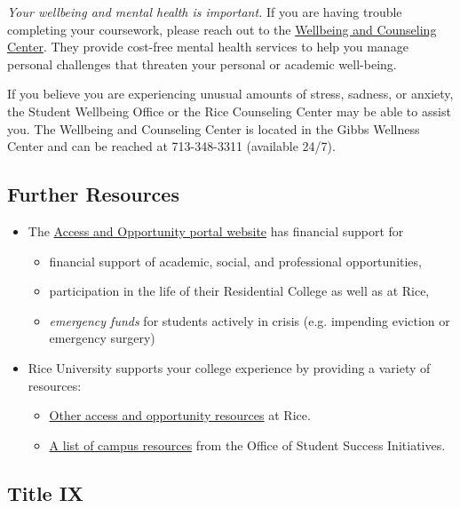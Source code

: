 \documentclass[11pt]{article}
\begin{document}
\emph{Your wellbeing and mental health is important.} If you are having trouble completing your coursework, please reach out to the \href{https://wellbeing.rice.edu/}{Wellbeing and Counseling Center}. They provide cost-free mental health services to help you manage personal challenges that threaten your personal or academic well-being. 

If you believe you are experiencing unusual amounts of stress, sadness, or anxiety, the Student Wellbeing Office or the Rice Counseling Center may be able to assist you. The Wellbeing and Counseling Center is located in the Gibbs Wellness Center and can be reached at 713-348-3311 (available 24/7).


\subsection{Further Resources}

\begin{itemize}[]
    \item The \href{https://aop.rice.edu/}{Access and Opportunity portal website} has financial support for
    \begin{itemize}[]
        \item financial support of academic, social, and professional opportunities,
        \item participation in the life of their Residential College as well as at Rice,
        \item \emph{emergency funds} for students actively in crisis (e.g. impending eviction or emergency surgery)
    \end{itemize}
    \item Rice University supports your college experience by providing a variety of resources:
    \begin{itemize}[]
        \item \href{https://aop.rice.edu/other-sources-support}{Other access and opportunity resources} at Rice.
        \item \href{https://success.rice.edu/ssi-advising/student-success-resources}{A list of campus resources} from the Office of Student Success Initiatives.
    \end{itemize}

\end{itemize}



\subsection*{Title IX}
\end{document}
